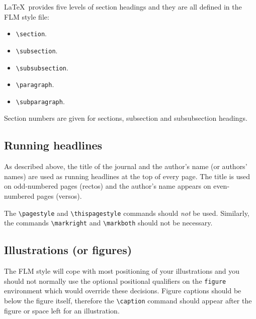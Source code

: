 \documentclass[lineno]{JFM-FLM_Au}
\begin{document}
LaTeX\ provides five levels of section headings and they are all
defined in the FLM style file:
\begin{itemize}
  \item \verb"\section".
  \item \verb"\subsection".
  \item \verb"\subsubsection".
  \item \verb"\paragraph".
  \item \verb"\subparagraph".
\end{itemize}
Section numbers are given for sections, subsection and subsubsection headings.

\subsection{Running headlines}

As described above, the title of the journal and the author's name (or authors'
names) are used as running headlines at the top of every page.
The title is used on odd-numbered pages (rectos) and the author's name appears
on even-numbered pages (versos).

The \verb"\pagestyle" and \verb"\thispagestyle" commands should {\em not\/} be
used.
Similarly, the commands \verb"\markright" and \verb"\markboth" should not be
necessary.

\subsection{Illustrations (or figures)}

The FLM style will cope with most positioning of your illustrations
and you should not normally use the optional positional qualifiers on
the \verb"figure" environment which would override these decisions.
Figure captions should be below the figure itself, therefore the \verb"\caption"
command should appear after the figure or space left for an illustration.
\end{document}
